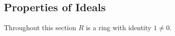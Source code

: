 \documentclass[../main]{subfiles}
\begin{document}
\subsection{Properties of Ideals}

Throughout this section $R$ is a ring with identity $1 \neq 0$.


\begin{dfn}
 
\end{dfn}




















 
 
 
 
 
 
 
 
 
 
 
 
 
 
 
 
 
 
 
 
 
 
 
 
 
\end{document}
